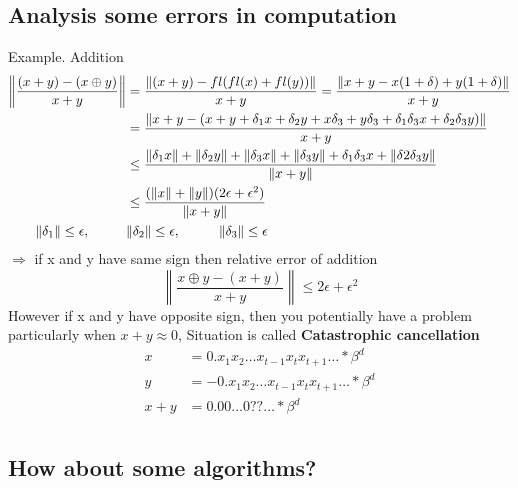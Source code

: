 \documentclass[10pt,usletter]{article}
\newcommand{\tab}[1][1cm]{\hspace*{#1}}
\begin{document}
\subsection{Analysis some errors in computation}
Example. Addition
\begin{align*}
\left\|\frac{(x+y)-(x\oplus y)}{x + y}\right\|&=\frac{\|(x+y)-fl(fl(x)+fl(y))\|}{x+y}=\frac{\|x+y-x(1+\delta)+y(1+\delta)\|}{x+y}\\
&=\frac{\|x+y-(x+y+\delta_1 x+\delta_2 y + x\delta_3 + y\delta_3 + \delta_1\delta_3 x+ \delta_2 \delta_3 y)\|}{x+y}\\
&\leq \frac{\|\delta_1 x\|+\|\delta_2 y\| + \|\delta_3 x\| + \|\delta_3 y\| + \delta_1\delta_3 x + \|\delta2\delta_3 y\|}{\|x+y\|}\\
&\le \frac{(\|x\|+\|y\|)(2\epsilon + \epsilon^2)}{\|x+y\|} \\
\|\delta_1\| \le \epsilon,\tab &\|\delta_2\| \le \epsilon,\tab \|\delta_3\| \le \epsilon
\end{align*}
$\Rightarrow$ if x and y have same sign then relative error of addition $$\left\|\frac{x \oplus y - (x+y)}{x+y}\right\| \le 2\epsilon + \epsilon^2$$
However if x and y have opposite sign, then you potentially have a problem particularly when $x+y \approx 0$, Situation is called \textbf{Catastrophic cancellation}
\begin{align*}
x&= 0.x_1x_2\hdots x_{t-1} x_t x_{t+1}\hdots * \beta^d\\
y&=-0.x_1x_2\hdots x_{t-1} x_t x_{t+1}\hdots * \beta^d\\
x+y&= 0.00\hdots0??\hdots * \beta^d\\
\end{align*}

\subsection{How about some algorithms?}
\end{document}
